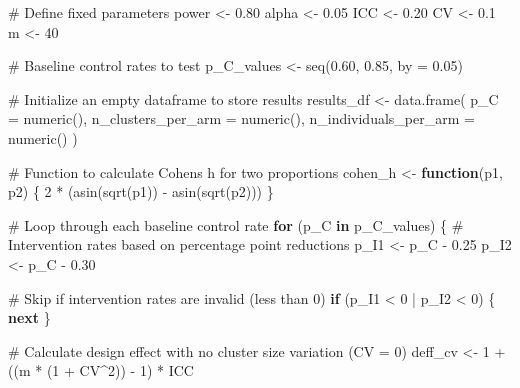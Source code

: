 \documentclass[
  letterpaper,
  DIV=11,
  numbers=noendperiod]{scrartcl}
\newenvironment{Shaded}{\begin{snugshade}}{\end{snugshade}}
\newcommand{\AttributeTok}[1]{\textcolor[rgb]{0.40,0.45,0.13}{#1}}
\newcommand{\CommentTok}[1]{\textcolor[rgb]{0.37,0.37,0.37}{#1}}
\newcommand{\ControlFlowTok}[1]{\textcolor[rgb]{0.00,0.23,0.31}{\textbf{#1}}}
\newcommand{\DecValTok}[1]{\textcolor[rgb]{0.68,0.00,0.00}{#1}}
\newcommand{\FloatTok}[1]{\textcolor[rgb]{0.68,0.00,0.00}{#1}}
\newcommand{\FunctionTok}[1]{\textcolor[rgb]{0.28,0.35,0.67}{#1}}
\newcommand{\NormalTok}[1]{\textcolor[rgb]{0.00,0.23,0.31}{#1}}
\newcommand{\OtherTok}[1]{\textcolor[rgb]{0.00,0.23,0.31}{#1}}
\newcommand{\SpecialCharTok}[1]{\textcolor[rgb]{0.37,0.37,0.37}{#1}}
\begin{document}
\begin{Shaded}
\begin{Highlighting}[]
\CommentTok{\# Define fixed parameters}
\NormalTok{power }\OtherTok{\textless{}{-}} \FloatTok{0.80}
\NormalTok{alpha }\OtherTok{\textless{}{-}} \FloatTok{0.05}
\NormalTok{ICC }\OtherTok{\textless{}{-}} \FloatTok{0.20}
\NormalTok{CV }\OtherTok{\textless{}{-}} \FloatTok{0.1}
\NormalTok{m }\OtherTok{\textless{}{-}} \DecValTok{40}

\CommentTok{\# Baseline control rates to test}
\NormalTok{p\_C\_values }\OtherTok{\textless{}{-}} \FunctionTok{seq}\NormalTok{(}\FloatTok{0.60}\NormalTok{, }\FloatTok{0.85}\NormalTok{, }\AttributeTok{by =} \FloatTok{0.05}\NormalTok{)}

\CommentTok{\# Initialize an empty dataframe to store results}
\NormalTok{results\_df }\OtherTok{\textless{}{-}} \FunctionTok{data.frame}\NormalTok{(}
  \AttributeTok{p\_C =} \FunctionTok{numeric}\NormalTok{(),}
  \AttributeTok{n\_clusters\_per\_arm =} \FunctionTok{numeric}\NormalTok{(),}
  \AttributeTok{n\_individuals\_per\_arm =} \FunctionTok{numeric}\NormalTok{()}
\NormalTok{)}

\CommentTok{\# Function to calculate Cohen\textquotesingle{}s h for two proportions}
\NormalTok{cohen\_h }\OtherTok{\textless{}{-}} \ControlFlowTok{function}\NormalTok{(p1, p2) \{}
  \DecValTok{2} \SpecialCharTok{*}\NormalTok{ (}\FunctionTok{asin}\NormalTok{(}\FunctionTok{sqrt}\NormalTok{(p1)) }\SpecialCharTok{{-}} \FunctionTok{asin}\NormalTok{(}\FunctionTok{sqrt}\NormalTok{(p2)))}
\NormalTok{\}}

\CommentTok{\# Loop through each baseline control rate}
\ControlFlowTok{for}\NormalTok{ (p\_C }\ControlFlowTok{in}\NormalTok{ p\_C\_values) \{}
  \CommentTok{\# Intervention rates based on percentage point reductions}
\NormalTok{  p\_I1 }\OtherTok{\textless{}{-}}\NormalTok{ p\_C }\SpecialCharTok{{-}} \FloatTok{0.25}
\NormalTok{  p\_I2 }\OtherTok{\textless{}{-}}\NormalTok{ p\_C }\SpecialCharTok{{-}} \FloatTok{0.30}
  
  \CommentTok{\# Skip if intervention rates are invalid (less than 0)}
  \ControlFlowTok{if}\NormalTok{ (p\_I1 }\SpecialCharTok{\textless{}} \DecValTok{0} \SpecialCharTok{|}\NormalTok{ p\_I2 }\SpecialCharTok{\textless{}} \DecValTok{0}\NormalTok{) \{}
    \ControlFlowTok{next}
\NormalTok{  \}}

  \CommentTok{\# Calculate design effect with no cluster size variation (CV = 0)}
\NormalTok{  deff\_cv }\OtherTok{\textless{}{-}} \DecValTok{1} \SpecialCharTok{+}\NormalTok{ ((m }\SpecialCharTok{*}\NormalTok{ (}\DecValTok{1} \SpecialCharTok{+}\NormalTok{ CV}\SpecialCharTok{\^{}}\DecValTok{2}\NormalTok{)) }\SpecialCharTok{{-}} \DecValTok{1}\NormalTok{) }\SpecialCharTok{*}\NormalTok{ ICC}
  

\end{Highlighting}
\end{Shaded}
\end{document}
